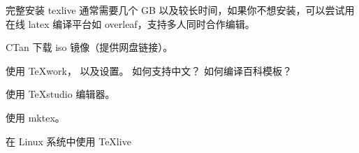 
\begin{issues}
\issueTODO
\end{issues}

完整安装 texlive 通常需要几个 GB 以及较长时间，如果你不想安装，可以尝试用在线 latex 编译平台如 overleaf，支持多人同时合作编辑。

CTan 下载 iso 镜像（提供网盘链接）。

使用 TeXwork， 以及设置。 如何支持中文？ 如何编译百科模板？

使用 TeXstudio 编辑器。

使用 mktex。

在 Linux 系统中使用 TeXlive

